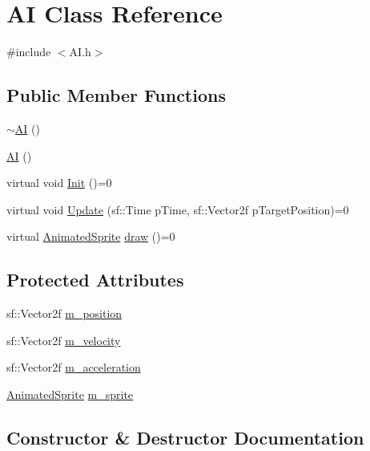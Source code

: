 \hypertarget{class_a_i}{}\section{AI Class Reference}
\label{class_a_i}


{\ttfamily \#include $<$A\+I.\+h$>$}

\subsection*{Public Member Functions}
\begin{DoxyCompactItemize}
\item 
\hyperlink{class_a_i_a66a8645f0c27285cd75346f2c2bbfb14}{$\sim$\+AI} ()
\item 
\hyperlink{class_a_i_a64ec60281e9eb8496f16525615db54b7}{AI} ()
\item 
virtual void \hyperlink{class_a_i_ac80497af3767e78d7167317f9f7708d3}{Init} ()=0
\item 
virtual void \hyperlink{class_a_i_a2e99f0dce9e1daa938ab4604dabb60f0}{Update} (sf\+::\+Time p\+Time, sf\+::\+Vector2f p\+Target\+Position)=0
\item 
virtual \hyperlink{class_animated_sprite}{Animated\+Sprite} \hyperlink{class_a_i_ae6dd19104a86c350d521ccd5d3c928c5}{draw} ()=0
\end{DoxyCompactItemize}
\subsection*{Protected Attributes}
\begin{DoxyCompactItemize}
\item 
sf\+::\+Vector2f \hyperlink{class_a_i_a4bf027954217b1a88e7aeb154e569be8}{m\+\_\+position}
\item 
sf\+::\+Vector2f \hyperlink{class_a_i_a0cdbc2caf054dd4dce2d51357ee98d17}{m\+\_\+velocity}
\item 
sf\+::\+Vector2f \hyperlink{class_a_i_a2527c9a48210634111f73ed4695f31c8}{m\+\_\+acceleration}
\item 
\hyperlink{class_animated_sprite}{Animated\+Sprite} \hyperlink{class_a_i_a1110fa8ed47f193fb4c035ea92ac39dc}{m\+\_\+sprite}
\end{DoxyCompactItemize}


\subsection{Constructor \& Destructor Documentation}
\mbox{\label{class_a_i_a66a8645f0c27285cd75346f2c2bbfb14}} 
